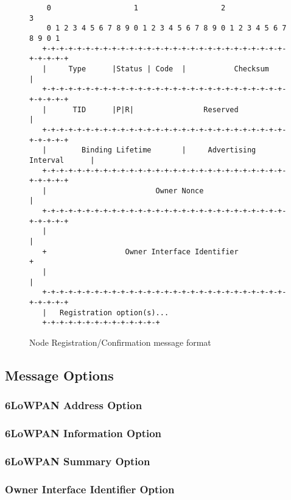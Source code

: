\begin{figure}[htp]
\begin{mylisting}
\begin{verbatim}
    0                   1                   2                   3
    0 1 2 3 4 5 6 7 8 9 0 1 2 3 4 5 6 7 8 9 0 1 2 3 4 5 6 7 8 9 0 1
   +-+-+-+-+-+-+-+-+-+-+-+-+-+-+-+-+-+-+-+-+-+-+-+-+-+-+-+-+-+-+-+-+
   |     Type      |Status | Code  |           Checksum            |
   +-+-+-+-+-+-+-+-+-+-+-+-+-+-+-+-+-+-+-+-+-+-+-+-+-+-+-+-+-+-+-+-+
   |      TID      |P|R|                Reserved                   |
   +-+-+-+-+-+-+-+-+-+-+-+-+-+-+-+-+-+-+-+-+-+-+-+-+-+-+-+-+-+-+-+-+
   |        Binding Lifetime       |     Advertising Interval      |
   +-+-+-+-+-+-+-+-+-+-+-+-+-+-+-+-+-+-+-+-+-+-+-+-+-+-+-+-+-+-+-+-+
   |                         Owner Nonce                           |
   +-+-+-+-+-+-+-+-+-+-+-+-+-+-+-+-+-+-+-+-+-+-+-+-+-+-+-+-+-+-+-+-+
   |                                                               |
   +                  Owner Interface Identifier                   +
   |                                                               |
   +-+-+-+-+-+-+-+-+-+-+-+-+-+-+-+-+-+-+-+-+-+-+-+-+-+-+-+-+-+-+-+-+
   |   Registration option(s)...
   +-+-+-+-+-+-+-+-+-+-+-+-+-+
\end{verbatim}
\end{mylisting}
\caption{Node Registration/Confirmation message format}\label{fig:nr.nc.format}
\end{figure}


\subsection{Message Options}
\subsubsection{6LoWPAN Address Option}\label{nd.option.address}

\subsubsection{6LoWPAN Information Option}\label{nd.option.info}

\subsubsection{6LoWPAN Summary Option}\label{nd.option.summary}

\subsubsection{Owner Interface Identifier Option}\label{sec:nd.oiio}